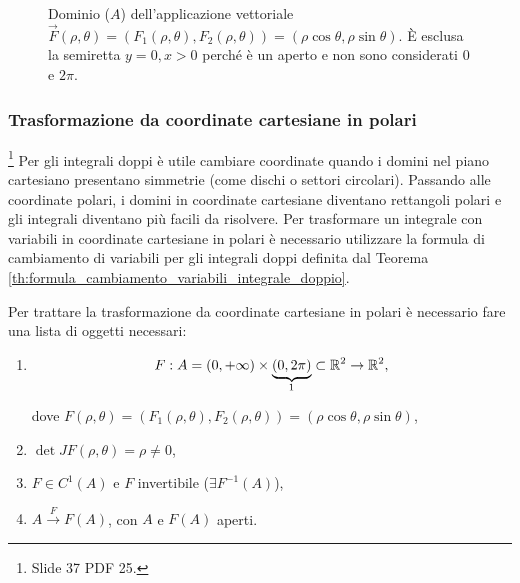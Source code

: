 \begin{figure}[ht]
	\centering
	\caption{Dominio ($A$) dell'applicazione vettoriale $\vec{F}(\rho, \theta)=(F_1(\rho, \theta), F_2(\rho, \theta)) = (\rho\cos\theta, \rho\sin\theta)$. È esclusa la semiretta $y=0, x>0$ perché è un aperto e non sono considerati 0 e $2\pi$. }
	\label{fig:dominio_applicazione_vettoriale_jacobiana}
\end{figure}

\subsubsection{Trasformazione da coordinate cartesiane in polari}\footnote{Slide 37 PDF 25.}
Per gli integrali doppi è utile cambiare coordinate quando i domini nel piano cartesiano presentano simmetrie (come dischi o settori circolari). Passando alle coordinate polari, i domini in coordinate cartesiane diventano rettangoli polari e gli integrali diventano più facili da risolvere. Per trasformare un integrale con variabili in coordinate cartesiane in polari è necessario utilizzare la formula di cambiamento di variabili per gli integrali doppi definita dal Teorema \ref{th:formula_cambiamento_variabili_integrale_doppio}.

Per trattare la trasformazione da coordinate cartesiane in polari è necessario fare una lista di oggetti necessari:
\begin{enumerate}
	\item
	\begin{equation*}
		F:A=(0,+\infty) \times \underbrace{(0,2\pi)}_{\footnotemark}\subset\mathbb{R}^2\rightarrow \mathbb{R}^2,
	\end{equation*}
	dove $F(\rho, \theta)=(F_1(\rho, \theta), F_2(\rho, \theta)) = (\rho\cos\theta, \rho\sin\theta)$,
	\item $\det JF(\rho, \theta)=\rho\neq 0$,
	\item $F\in C^1(A)$ e $F$ invertibile ($\exists F^{-1}(A)$),
	\item $A\overset{F}{\rightarrow} F(A)$, con $A$ e $F(A)$ aperti.
\end{enumerate}

